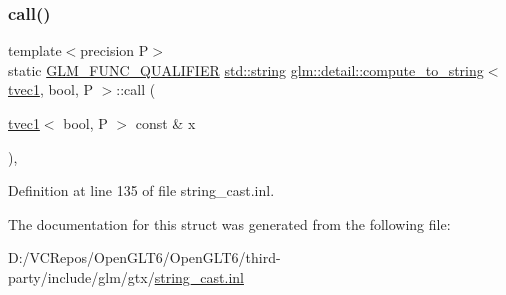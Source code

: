 \subsubsection{\texorpdfstring{call()}{call()}}
{\footnotesize\ttfamily template$<$precision P$>$ \\
static \mbox{\hyperlink{setup_8hpp_a33fdea6f91c5f834105f7415e2a64407}{G\+L\+M\+\_\+\+F\+U\+N\+C\+\_\+\+Q\+U\+A\+L\+I\+F\+I\+ER}} \mbox{\hyperlink{glad_8h_ac83513893df92266f79a515488701770}{std\+::string}} \mbox{\hyperlink{structglm_1_1detail_1_1compute__to__string}{glm\+::detail\+::compute\+\_\+to\+\_\+string}}$<$ \mbox{\hyperlink{structglm_1_1tvec1}{tvec1}}, bool, P $>$\+::call (\begin{DoxyParamCaption}\item[{\mbox{\hyperlink{structglm_1_1tvec1}{tvec1}}$<$ bool, P $>$ const \&}]{x }\end{DoxyParamCaption})\hspace{0.3cm}{\ttfamily [inline]}, {\ttfamily [static]}}



Definition at line 135 of file string\+\_\+cast.\+inl.



The documentation for this struct was generated from the following file\+:\begin{DoxyCompactItemize}
\item 
D\+:/\+V\+C\+Repos/\+Open\+G\+L\+T6/\+Open\+G\+L\+T6/third-\/party/include/glm/gtx/\mbox{\hyperlink{string__cast_8inl}{string\+\_\+cast.\+inl}}\end{DoxyCompactItemize}
